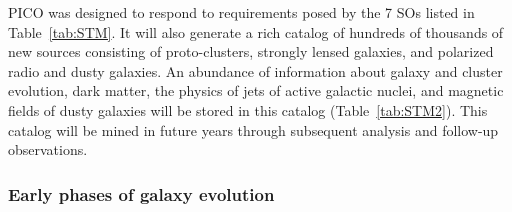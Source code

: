 \documentclass[PICOReport.tex]{subfiles}
\begin{document}
PICO was designed to respond to requirements posed by the 7 \ac{SOs} listed in Table~\ref{tab:STM}. It will also generate a rich catalog of hundreds of thousands of new sources consisting of proto-clusters, strongly lensed galaxies, and polarized radio and dusty galaxies. An abundance of information about galaxy and cluster evolution, dark matter, the physics of jets of active galactic nuclei, and magnetic fields of dusty galaxies will be stored in this catalog (Table~\ref{tab:STM2}). This catalog will be mined in future years through subsequent analysis and follow-up observations. 


\subsubsection{Early phases of galaxy evolution}

\end{document}
